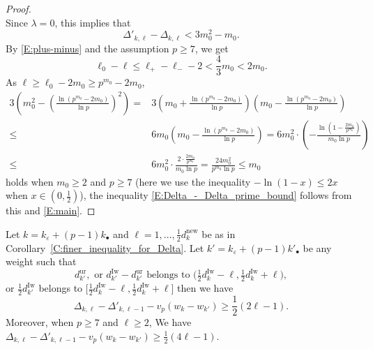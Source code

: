 \begin{proof}
\[    \]
    Since $\lambda=0$, this implies that
    \begin{equation}
    \label{E:main}
    \Delta'_{k, \ell} - \Delta_{k, \ell}<3m_0^2-m_0.
    \end{equation}
    By \eqref{E:plus-minus} and the assumption $p\geq 7$, we get
    \[
    \ell_0-\ell\leq \ell_+-\ell_--2<\frac 43 m_0<2m_0.
    \]
    As $\ell \geq \ell_0-2m_0\geq p^{m_0}-2m_0$,
    \begin{align*}
    3\left(m_0^2 - (\frac{\ln (p^{m_0}-2m_0)}{\ln p})^2\right)=&3(m_0+\frac{\ln(p^{m_0}-2m_0)}{\ln p})(m_0-\frac{\ln(p^{m_0}-2m_0)}{\ln p})\\
    \leq& 6m_0(m_0-\frac{\ln(p^{m_0}-2m_0)}{\ln p})=6m_0^2\cdot(-\frac{\ln(1-\frac{2m_0}{p^{m_0}})}{m_0\ln p})\\
    \leq&6m_0^2\cdot\frac{2\cdot \frac{2m_0}{p^{m_0}}}{m_0\ln p}=\frac{24m_0^2}{p^{m_0}\ln p}\leq m_0
    \end{align*}
    holds when $m_0 \geq 2$ and $p \geq 7$ (here we use the inequality $-\ln(1-x)\leq 2x$ when $x\in (0,\frac 12)$), the inequality \eqref{E:Delta_-_Delta_prime_bound} follows from this and \eqref{E:main}.
\end{proof}

\begin{corollary}
    \label{C:Delta_-_Delta_prime}
    Let $k=k_\varepsilon + (p-1)k_\bullet $ and $\ell = 1, \dots, \frac 12d_k^{\mathrm{new}}$ be as in Corollary~\ref{C:finer_inequality_for_Delta}. Let $k' = k_\varepsilon + (p-1)k'_\bullet$ be any weight such that
    $$
    d_{k'}^{\mathrm{ur}}, \textrm{ or } d_{k'}^{\mathrm{Iw}}- d_{k'}^{\mathrm{ur}}\textrm{ belongs to } \big(\tfrac 12d_k^{\mathrm{Iw}}-\ell, \tfrac 12 d_k^{\mathrm{Iw}}+\ell\big),
    $$
    or $\tfrac 12 d_{k'}^{\mathrm{Iw}}$ belongs to $\big[\tfrac 12d_k^{\mathrm{Iw}}-\ell, \tfrac 12 d_k^{\mathrm{Iw}}+\ell\big]$
    then we have
    \begin{equation}
    \label{E:Delta_-_Delta_prime_strong}
    \Delta_{k, \ell} - \Delta'_{k,\ell-1} -v_p(w_{k} - w_{k'}) \geq \frac 12 (2\ell-1).
    \end{equation}
    Moreover, when $p \geq 7$ and $\ell \geq 2$, We have $\Delta_{k, \ell}-\Delta'_{k, \ell-1} -v_p(w_{k} - w_{k'}) \geq \frac 12 (4\ell-1).$
\end{corollary}

